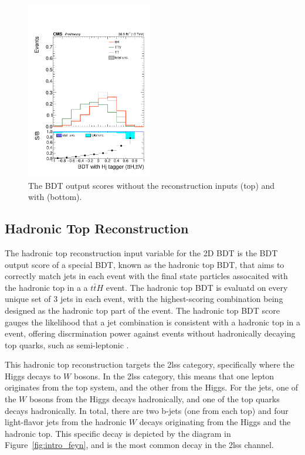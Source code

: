 \begin{figure}[htp]
\includegraphics[width=0.49\textwidth]{ch9_figs/kinMVA_2lss_ttV_withHj.pdf}
\caption[BDT output scores with and without reconstruction inputs]{The BDT output scores without the reconstruction inputs (top) and with (bottom).}
\label{fig:inputs3}
\end{figure}

\subsection{Hadronic Top Reconstruction}
The hadronic top reconstruction input variable for the 2D BDT is the BDT output score of a special BDT, known as the hadronic top BDT,
that aims to correctly match jets in each event with the final state particles assocaited with the hadronic top in a 
a $t\bar{t}H$ event. The hadronic top BDT is evaluatd on every unique set of 3 jets in each event, with the highest-scoring combination
being designed as the hadronic top part of the event. The hadronic top BDT score gauges the likelihood that a jet combination is
consistent with a hadronic top in a \tth event, offering discrmination power against events without hadronically decaying top quarks, such as
semi-leptonic \ttbar.

This hadronic top reconstruction targets the 2lss category, specifically where the Higgs decays
to $W$ bosons. In the 2lss category, this means that one lepton originates from the
top system, and the other from the Higgs. For the jets, one of the
$W$ bosons from the Higgs decays hadronically, and one of the top quarks decays
hadronically. In total, there are two b-jets (one from each top) and four light-flavor jets
from the hadronic $W$ decays originating from the Higgs and the hadronic top.
This specific decay is depicted by the diagram in Figure~\ref{fig:intro_feyn}, and is the most common \tth decay in the 2lss channel.

